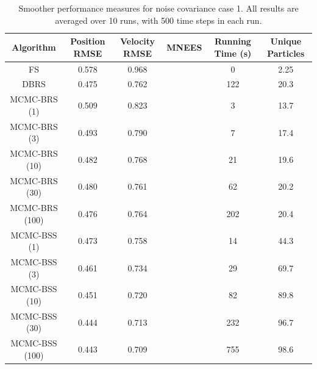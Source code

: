 \documentclass[10pt,twocolumn,twoside]{IEEEtran}
\begin{document}
\begin{table}[!t]%
\renewcommand{\arraystretch}{1.3}
\caption{Smoother performance measures for noise covariance case 1. All results are averaged over 10 runs, with 500 time steps in each run.}
\label{tab:case1_performance}
{\scriptsize
\centering
\begin{tabular}{|c||c|c|c|c|c|}
\hline
Algorithm & \begin{minipage}[c]{0.9cm} Position RMSE \end{minipage} & \begin{minipage}[c]{0.9cm}  Velocity RMSE \end{minipage} & \begin{minipage}[c]{0.9cm}  MNEES \end{minipage} & \begin{minipage}[c]{0.9cm}  Running Time (s) \end{minipage} & \begin{minipage}[c]{0.9cm}  Unique Particles \end{minipage} \\
\hline
FS              & 0.578 & 0.968 &  & 0 & 2.25 \\
DBRS            & 0.475 & 0.762 &  & 122 & 20.3 \\
\hline
MCMC-BRS (1)    & 0.509 & 0.823 &  & 3 & 13.7  \\
MCMC-BRS (3)    & 0.493 & 0.790 &  & 7 & 17.4  \\
MCMC-BRS (10)   & 0.482 & 0.768 &  & 21 & 19.6 \\
MCMC-BRS (30)   & 0.480 & 0.761 &  & 62 & 20.2 \\
MCMC-BRS (100)  & 0.476 & 0.764 &  & 202 & 20.4  \\
\hline
MCMC-BSS (1)	& 0.473 & 0.758 &  & 14 & 44.3 \\
MCMC-BSS (3)	& 0.461 & 0.734 &  & 29 & 69.7 \\
MCMC-BSS (10)	& 0.451 & 0.720 &  & 82 & 89.8 \\
MCMC-BSS (30)	& 0.444 & 0.713 &  & 232 & 96.7 \\
MCMC-BSS (100)  & 0.443 & 0.709 &  & 755 & 98.6 \\
\hline
\end{tabular}
}
\end{table}
\end{document}
